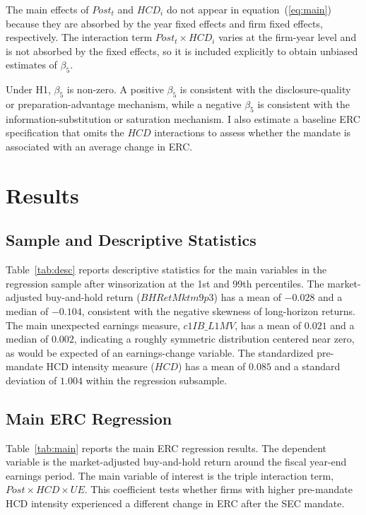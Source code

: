 \documentclass[12pt]{article}
\begin{document}
The main effects of $Post_t$ and $HCD_i$ do not appear in equation~(\ref{eq:main}) because they are absorbed by the year fixed effects and firm fixed effects, respectively. The interaction term $Post_t \times HCD_i$ varies at the firm-year level and is not absorbed by the fixed effects, so it is included explicitly to obtain unbiased estimates of $\beta_5$.

Under H1, $\beta_5$ is non-zero. A positive $\beta_5$ is consistent with the disclosure-quality or preparation-advantage mechanism, while a negative $\beta_5$ is consistent with the information-substitution or saturation mechanism. I also estimate a baseline ERC specification that omits the $HCD$ interactions to assess whether the mandate is associated with an average change in ERC.

{\section{Results}

\subsection{Sample and Descriptive Statistics}

Table~\ref{tab:desc} reports descriptive statistics for the main variables in the regression sample after winsorization at the 1st and 99th percentiles. The market-adjusted buy-and-hold return ($BHRetMktm9p3$) has a mean of $-0.028$ and a median of $-0.104$, consistent with the negative skewness of long-horizon returns. The main unexpected earnings measure, $c1IB\_L1MV$, has a mean of $0.021$ and a median of $0.002$, indicating a roughly symmetric distribution centered near zero, as would be expected of an earnings-change variable. The standardized pre-mandate HCD intensity measure ($HCD$) has a mean of $0.085$ and a standard deviation of $1.004$ within the regression subsample.

\subsection{Main ERC Regression}

Table~\ref{tab:main} reports the main ERC regression results. The dependent variable is the market-adjusted buy-and-hold return around the fiscal year-end earnings period. The main variable of interest is the triple interaction term, $Post \times HCD \times UE$. This coefficient tests whether firms with higher pre-mandate HCD intensity experienced a different change in ERC after the SEC mandate.

}
\end{document}
